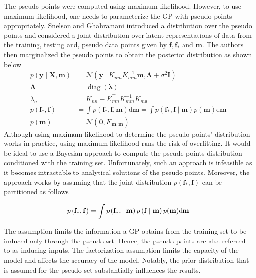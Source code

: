 \documentclass[letterpaper,11pt]{extarticle}
\begin{document}
The pseudo points were computed using maximum likelihood. However, to use maximum likelihood, one needs to parameterize the GP with pseudo points appropriately. Snelson and Ghahramani \cite{SnelsonEZ06} introduced a distribution over the pseudo points and considered a joint distribution over latent representations of data from the training, testing and, pseudo data points given by $\mathbf{f}, \mathbf{f_*}$ and $\mathbf{m}$. The authors then marginalized the pseudo points to obtain the posterior distribution as shown below
$$
\begin{aligned}
p(\mathbf{y} \mid \mathbf{X}, \mathbf{m}) &= \mathcal{N}\left(\mathbf{y} \mid K_{nm} K_{mm}^{-1} \mathbf{m}, \mathbf{\Lambda}+\sigma^{2} \mathbf{I}\right) \\
\mathbf{\Lambda} &=\operatorname{diag}(\boldsymbol{\lambda}) \\
\lambda_{n} &= K_{nn}-K_{mn}^{\top} K_{mm}^{-1} K_{mn} \\
p\left(\mathbf{f}_{*}, \mathbf{f}\right) &= \int p\left(\mathbf{f}_{*}, \mathbf{f}, \mathbf{m}\right) \mathrm{d} \mathbf{m} =\int p\left(\mathbf{f}_{*}, \mathbf{f} \mid \mathbf{m}\right) p(\mathbf{m}) \mathrm{d} \mathbf{m} \\
p(\mathbf{m}) &=\mathcal{N}\left(\mathbf{0}, K_{\mathbf{m}, \mathbf{m}}\right)
\end{aligned}
$$
Although using maximum likelihood to determine the pseudo points' distribution works in practice, using maximum likelihood runs the risk of overfitting. It would be ideal to use a Bayesian approach to compute the pseudo points distribution conditioned with the training set. Unfortunately, such an approach is infeasible as it becomes intractable to analytical solutions of the pseudo points. Moreover, the approach works by assuming that the joint distribution $p\left(\mathbf{f}_{*}, \mathbf{f}\right)$ can be partitioned as follows

$$
p\left(\mathbf{f}_{*}, \mathbf{f}\right) =\int p\left(\mathbf{f}_{*}, \mid \mathbf{m}\right)p\left(\mathbf{f} \mid \mathbf{m}\right) p(\mathbf{m}) \mathrm{d} \mathbf{m} \\
$$

The assumption limits the information a GP obtains from the training set to be induced only through the pseudo set. Hence, the pseudo points are also referred to as inducing inputs. The factorization assumption limits the capacity of the model and affects the accuracy of the model. Notably, the prior distribution that is assumed for the pseudo set substantially influences the results. 
\end{document}
